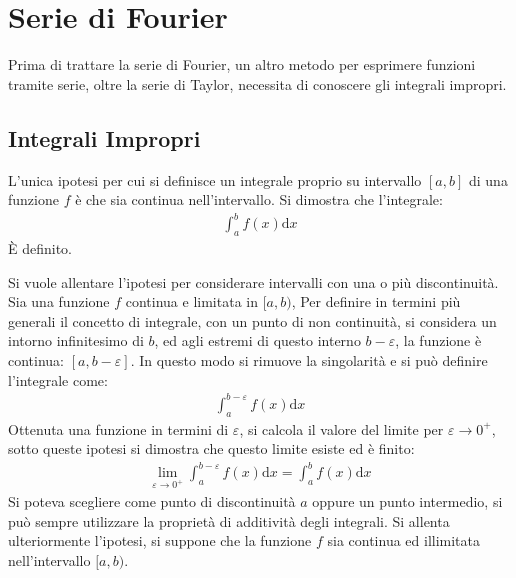 \documentclass{article}
\numberwithin{equation}{subsection}
\begin{document}
\section{Serie di Fourier}

Prima di trattare la serie di Fourier, un altro metodo per esprimere funzioni tramite serie, oltre la serie di Taylor, necessita di conoscere gli integrali impropri. 

\subsection{Integrali Impropri}

L'unica ipotesi per cui si definisce un integrale proprio su intervallo $[a,b]$ di una funzione $f$ è che sia continua nell'intervallo. Si dimostra che l'integrale:
\begin{gather*}
    \displaystyle\int_a^b f(x)\mathrm{d}x
\end{gather*}
È definito. 

Si vuole allentare l'ipotesi per considerare intervalli con una o più discontinuità. Sia una funzione $f$ continua e limitata in $[a,b)$, 
Per definire in termini più generali il concetto di integrale, con un punto di non continuità, si considera un intorno infinitesimo di $b$, ed agli estremi di questo interno $b-\varepsilon$, la funzione è continua: $[a,b-\varepsilon]$. In questo modo si rimuove la singolarità e si può definire l'integrale come:
\begin{gather*}
    \displaystyle\int_a^{b-\varepsilon}f(x)\mathrm{d}x
\end{gather*}
Ottenuta una funzione in termini di $\varepsilon$, si calcola il valore del limite per $\varepsilon\to0^+$, sotto queste ipotesi si dimostra che questo limite esiste ed è finito:
\begin{gather*}
    \lim_{\varepsilon\to0^+}\displaystyle\int_a^{b-\varepsilon}f(x)\mathrm{d}x=\int_a^bf(x)\mathrm{d}x
\end{gather*}
Si poteva scegliere come punto di discontinuità $a$ oppure un punto intermedio, si può sempre utilizzare la proprietà di additività degli integrali. 
Si allenta ulteriormente l'ipotesi, si suppone che la funzione $f$ sia continua ed illimitata nell'intervallo $[a,b)$.  
\end{document}
